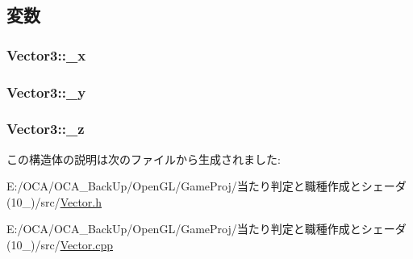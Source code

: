 \subsection{変数}
\hypertarget{struct_vector3_a345b01a1352e569e37d0226af4eff5c6}{
\subsubsection[{\-\_\-x}]{ Vector3\-::\-\_\-x}}\label{struct_vector3_a345b01a1352e569e37d0226af4eff5c6}
\hypertarget{struct_vector3_a5e3cec066537515a2387a34b57aed6ed}{
\subsubsection[{\-\_\-y}]{ Vector3\-::\-\_\-y}}\label{struct_vector3_a5e3cec066537515a2387a34b57aed6ed}
\hypertarget{struct_vector3_a895ad23c1a78588ace5c4aaadae984c5}{
\subsubsection[{\-\_\-z}]{ Vector3\-::\-\_\-z}}\label{struct_vector3_a895ad23c1a78588ace5c4aaadae984c5}


この構造体の説明は次のファイルから生成されました\-:\begin{DoxyCompactItemize}
\item 
E\-:/\-O\-C\-A/\-O\-C\-A\-\_\-\-Back\-Up/\-Open\-G\-L/\-Game\-Proj/当たり判定と職種作成とシェーダ(10\-\_)/src/\hyperlink{_vector_8h}{Vector.\-h}\item 
E\-:/\-O\-C\-A/\-O\-C\-A\-\_\-\-Back\-Up/\-Open\-G\-L/\-Game\-Proj/当たり判定と職種作成とシェーダ(10\-\_)/src/\hyperlink{_vector_8cpp}{Vector.\-cpp}\end{DoxyCompactItemize}
